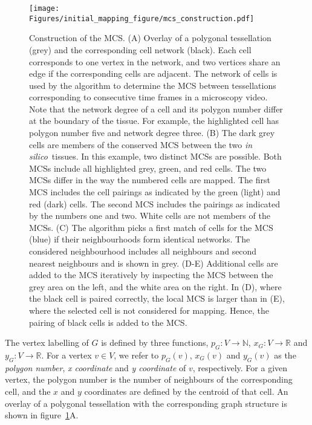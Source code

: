 \documentclass[a4paper,11pt]{article}
\newcommand{\insilico}{\textit{in silico}~}
\begin{document}

\begin{figure}[ht!]
\centering
\texttt{[image: Figures/initial\_mapping\_figure/mcs\_construction.pdf]}
\caption{Construction of the MCS. 
(A) Overlay of a polygonal tessellation (grey) and the corresponding cell network (black). Each cell corresponds to one vertex in the network, and two vertices share an edge if the corresponding cells are adjacent. The network of cells is used by the algorithm to determine the MCS between tessellations corresponding to consecutive time frames in a microscopy video. Note that the network degree of a cell and its polygon number differ at the boundary of the tissue. For example, the highlighted cell has polygon number five and network degree three.
(B) The dark grey cells are members of the conserved MCS between the two \insilico tissues. In this example, two distinct MCSs are possible. Both MCSs include all highlighted grey, green, and red cells. The two MCSs differ in the way the numbered cells are mapped. The first MCS includes the cell pairings as indicated by the green (light) and red (dark) cells. The second MCS includes the pairings as indicated by the numbers one and two. White cells are not members of the MCSs.
(C) The algorithm picks a first match of cells for the MCS (blue) if their neighbourhoods form identical networks. 
The considered neighbourhood includes all neighbours and second nearest neighbours and is shown in grey. 
(D-E) Additional cells are added to the MCS iteratively by inspecting the MCS between the grey area on the left, and the white area on the right. 
In (D), where the black cell is paired correctly, the local MCS is larger than in (E), where the selected cell is not considered for mapping. Hence, the pairing of black cells is added to the MCS.} \label{fig:mcs_construction}
\end{figure}


The vertex labelling of $G$ is defined by three functions, $p_{G} : V \rightarrow \mathbb{N}$, $x_{G} : V \rightarrow \mathbb{R}$ and $y_{G} : V \rightarrow \mathbb{R}$. 
For a vertex $v \in V$, we refer to $p_{G}(v)$, $x_{G}(v)$ and $y_{G}(v)$ as the \textit{polygon number}, \textit{x coordinate} and \textit{y coordinate} of $v$, respectively. For a given vertex, the polygon number is the number of neighbours of the corresponding cell, and the $x$ and $y$ coordinates are defined by the centroid of that cell. An overlay of a polygonal tessellation with the corresponding graph structure is shown in figure~\ref{fig:mcs_construction}A.
\end{document}
